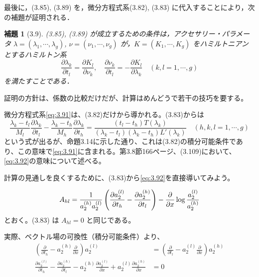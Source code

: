 \documentclass[paper=a4, fontsize=11pt]{jlreq} %
\newenvironment{story}{%
  \begin{mdframed}[
    backgroundcolor=red!5, %
    linewidth=0pt,         %
    innertopmargin=10pt,   %
    innerbottommargin=10pt,
    innerrightmargin=10pt, %
    innerleftmargin=10pt
  ]%
}{%
  \end{mdframed}%
}
\theoremstyle{break}
\newtheorem{lemma}[theorem]{補題}
\theoremstyle{qa}
\begin{document}
\begin{story}

最後に，(3.85), (3.89) を，微分方程式系(3.82), (3.83) に代入することにより，次の補題が証明される．

\begin{lemma}[3.9]
    (3.85), (3.89) が成立するための条件は，アクセサリー・パラメータ $\lambda = (\lambda_1, \cdots, \lambda_g)$, $\nu = (\nu_1, \cdots, \nu_g)$ が，$K = (K_1, \cdots, K_g)$ をハミルトニアンとするハミルトン系
    \begin{equation}
        \frac{\partial \lambda_k}{\partial t_l} = \frac{\partial K_l}{\partial \nu_k}, \quad 
        \frac{\partial \nu_k}{\partial t_l} = - \frac{\partial K_l}{\partial \lambda_k} \quad 
        (k,l = 1, \cdots, g)
        \tag{3.91}\label{eq:3.91}
    \end{equation}
    を満たすことである．
\end{lemma}

証明の方針は、係数の比較だけだが、計算はめんどうで若干の技巧を要する。

微分方程式系\eqref{eq:3.91}は、(3.82)だけから導かれる。(3.83)からは
\begin{equation}
    \frac{\lambda_k - t_l}{M_l} \frac{\partial \lambda_k}{\partial t_l} - \frac{\lambda_k - t_h}{M_h} \frac{\partial \lambda_k}{\partial t_h} 
    = \frac{(t_l - t_h) T(\lambda_k)}{(\lambda_k - t_l)(\lambda_k - t_h) L'(\lambda_k)} \quad 
    (h, k, l = 1, \cdots, g)
    \tag{3.92}\label{eq:3.92}
\end{equation}
という式が出るが、命題3.14に示した通り、これは(3.82)の積分可能条件であり、この意味で\eqref{eq:3.91}に含まれる。第3.8節166ページ、(3.109)において、\eqref{eq:3.92}の意味について述べる。

計算の見通しを良くするために、(3.83)から\eqref{eq:3.92}を直接導いてみよう。

\begin{equation}
    A_{hl} = \frac{1}{a_2^{(h)} a_2^{(l)}} \left( \frac{\partial a_2^{(l)}}{\partial t_h} - \frac{\partial a_2^{(h)}}{\partial t_l} \right) - \frac{\partial}{\partial x} \log \frac{a_2^{(l)}}{a_2^{(h)}} \notag
\end{equation}
とおく。(3.83) は $A_{hl} = 0$ と同じである。

\end{story}
実際、ベクトル場の可換性（積分可能条件）より、
\begin{align*}
    \left(\frac{\partial}{\partial t_h} - a_2^{(h)} \frac{\partial}{\partial x}\right) a_2^{(l)} &= \left(\frac{\partial}{\partial t_l} - a_2^{(l)} \frac{\partial}{\partial x}\right) a_2^{(h)} \\
    \frac{\partial a_2^{(l)}}{\partial t_h} - \frac{\partial a_2^{(h)}}{\partial t_l} - a_2^{(h)} \frac{\partial a_2^{(l)}}{\partial x} + a_2^{(l)} \frac{\partial a_2^{(h)}}{\partial x} &= 0
\end{align*}
\end{document}
